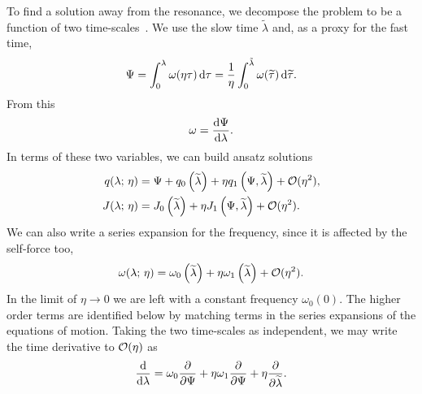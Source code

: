 To find a solution away from the resonance, we decompose the problem to be a function of two time-scales~\cite{Kevorkian1971}. We use the slow time $\widetilde{\lambda}$ and, as a proxy for the fast time,
\begin{equation}
\Psi = \int_{0}^{\lambda}{\omega(\eta\tau)}\,\mathrm{d}{\tau} = \frac{1}{\eta}\int_{0}^{\tilde{\lambda}}{\omega(\widetilde{\tau})}\,\mathrm{d}{\widetilde{\tau}}.
\end{equation}
From this
\begin{equation}
\omega = \dfrac{\mathrm{d} {\Psi}}{\mathrm{d} {\lambda}}.
\end{equation}
In terms of these two variables, we can build ansatz solutions
\begin{subequations}
\begin{align}
\label{eq:q-series}
q(\lambda;\,\eta) = {} & \Psi + q_0\left(\widetilde{\lambda}\right) + \eta q_1\left(\Psi,\widetilde{\lambda}\right) + \mathcal{O}({\eta^2}), \\
J(\lambda;\,\eta) = {} & J_0\left(\widetilde{\lambda}\right) + \eta J_1\left(\Psi,\widetilde{\lambda}\right) + \mathcal{O}({\eta^2}).
\label{eq:J-series}
\end{align}
\end{subequations}
We can also write a series expansion for the frequency, since it is affected by the self-force too,
\begin{equation}
\omega(\lambda;\,\eta) = \omega_0\left(\widetilde{\lambda}\right) + \eta \omega_1\left(\widetilde{\lambda}\right) + \mathcal{O}({\eta^2}).
\end{equation}
In the limit of $\eta \rightarrow 0$ we are left with a constant frequency $\omega_0(0)$. The higher order terms are identified below by matching terms in the series expansions of the equations of motion. Taking the two time-scales as independent, we may write the time derivative to $\mathcal{O}({\eta})$ as
\begin{equation}
\dfrac{\mathrm{d}}{\mathrm{d} {\lambda}} = \omega_0\dfrac{\partial}{\partial {\Psi}} + \eta\omega_1\dfrac{\partial}{\partial {\Psi}} + \eta\dfrac{\partial}{\partial {\widetilde{\lambda}}}.
\end{equation}

